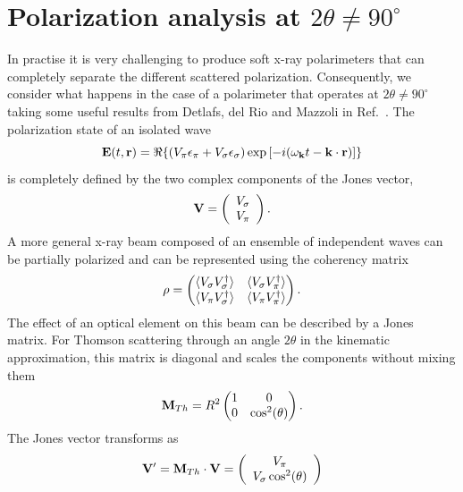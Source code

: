 \documentclass[aps,onecolumn, notitlepage, longbibliography]{revtex4-1}
\begin{document}
\section{Polarization analysis at $2\theta \neq 90^\circ$ }
In practise it is very challenging to produce soft x-ray polarimeters that can completely separate  the different scattered polarization. Consequently, we consider what happens in the case of a polarimeter that operates at $2\theta \neq 90^\circ$ taking some useful results from Detlafs, del Rio and Mazzoli in Ref.~\cite{Detlefs2012}. The polarization state of an isolated wave
\begin{equation}
        {\bf E}(t, {\bf r})
        = \Re \{
                \left(V_{\pi} \epsilon_{\pi} 
                + V_{\sigma} \epsilon_{\sigma}\right)
        \exp \left[ -i(\omega_{\bf k} t - {\bf k}\cdot{\bf r}) \right]
        \}
        \label{el_field}
\end{equation}
is completely defined by the two complex components of the Jones vector,
\begin{equation}
{\bf V} = \left(\begin{array}{c}V_\sigma\\V_\pi\end{array}\right). \end{equation}
A more general x-ray beam composed of an ensemble of independent waves can be partially polarized and can be represented using the coherency matrix
\begin{equation}
{\bf \rho} = 
  \begin{pmatrix}
    \langle V_{\sigma}V_{\sigma}^{\dagger} \rangle  & \langle V_{\sigma}V_{\pi}^{\dagger} \rangle \\
    \langle V_{\pi}V_{\sigma}^{\dagger} \rangle &  \langle V_{\pi}V_{\pi}^{\dagger} \rangle
  \end{pmatrix} .
\end{equation}
The effect of an optical element on this beam can be described by a Jones matrix. For Thomson scattering through an angle $2\theta$ in the kinematic approximation, this matrix is diagonal and scales the components without mixing them
\begin{equation}
{\bf M}_{Th} = R^2
  \begin{pmatrix}
    1  & 0  \\
    0 &  \cos^2(\theta)
  \end{pmatrix} .
\end{equation}
The Jones vector transforms as
\begin{equation}
{\bf V}^\prime = {\bf M}_{Th} \cdot {\bf V} =  \left(\begin{array}{c} V_\pi \\ V_\sigma \cos^2(\theta) \end{array}\right) \end{equation}
\end{document}
